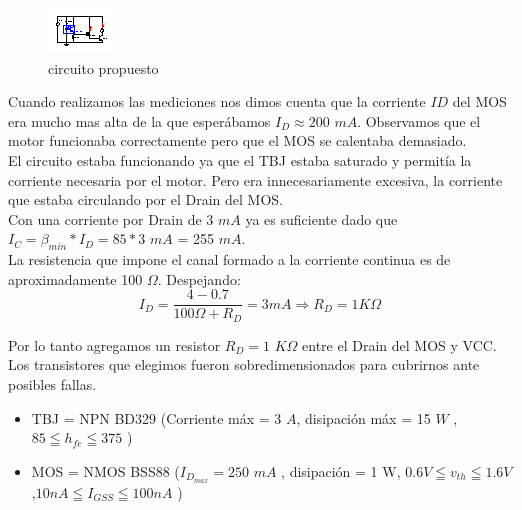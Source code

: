 \documentclass[a4paper]{article}
\begin{document}
\begin{figure}[H]
  \centering
    \includegraphics[width=\textwidth]{./xcircuit/Page_1.eps}
  \caption{circuito propuesto}
\end{figure}

Cuando realizamos las mediciones nos dimos cuenta que la corriente $ID$ del MOS era mucho mas alta de la que esperábamos $I_D\approx 200$ $mA$.
Observamos que el motor funcionaba correctamente pero que el MOS se calentaba demasiado.\\

El circuito estaba funcionando ya que el TBJ estaba saturado y permitía la corriente necesaria por el motor. Pero era innecesariamente excesiva, la corriente
que estaba circulando por el Drain del MOS. \\

Con una corriente por Drain de 3 $mA$ ya es suficiente dado que\\
$I_C=\beta_{min}*I_D=85*3$ $mA$ = 255 $mA$.\\
La resistencia que impone el canal formado a la corriente continua es de aproximadamente 100 $\Omega$. Despejando: \\

\begin{equation*}
 I_D=\frac{4 - 0.7}{ 100 \Omega + R_D } = 3 mA \Longrightarrow R_D= 1 K \Omega 
\end{equation*}

Por lo tanto agregamos un resistor $R_D=1$ $K \Omega$ 
entre el Drain del MOS y VCC.\\

Los transistores que elegimos fueron sobredimensionados para cubrirnos ante posibles fallas.\\
\begin{itemize}
  \item  TBJ = NPN BD329 (Corriente máx = 3 $A$,  disipación máx =  15 $W $ , $ 85 \leqq h_{fe} \leqq 375 $ )
  \item  MOS = NMOS BSS88 ($I_{D_{max}}=250$ $mA$ , disipación = 1 W, $0.6 V \leqq v_{th}\leqq 1.6 V$ ,$10 nA \leqq I_{GSS}\leqq 100 nA $ )
\end{itemize}
\end{document}
